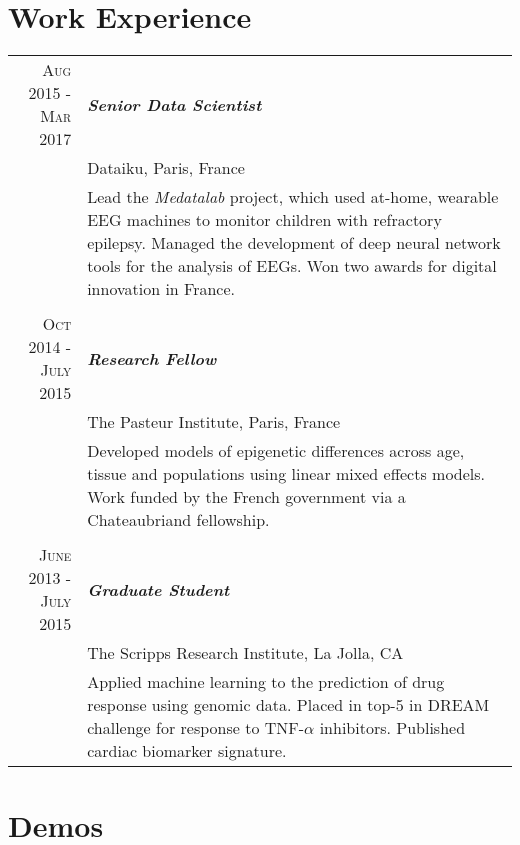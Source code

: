\documentclass{article}
\begin{document}
\section{Work Experience}
\begin{tabular}{r | p{11cm}}

 \raggedleft \textsc{Aug} 2015 - \textsc{Mar} 2017 & \emph{\textbf{Senior Data Scientist}} \\
   & Dataiku, Paris, France\\
 &\footnotesize{Lead the \emph{Medatalab} project, which used at-home, wearable EEG machines to monitor children with refractory epilepsy. Managed the development of deep neural network tools for the analysis of EEGs. Won two awards for digital innovation in France.} \\
 
 \multicolumn{2}{c}{} \\
 
\raggedleft \textsc{Oct} 2014 - \textsc{July} 2015 & \emph{\textbf{Research Fellow}} \\
   & The Pasteur Institute, Paris, France\\
 &\footnotesize{Developed models of epigenetic differences across age, tissue and populations using linear mixed effects models. Work funded by the French government via a Chateaubriand fellowship.} \\
 
  \multicolumn{2}{c}{} \\
 
\raggedleft \textsc{June} 2013 - \textsc{July} 2015 & \emph{\textbf{Graduate Student}} \\
   & The Scripps Research Institute, La Jolla, CA\\
 &\footnotesize{Applied machine learning to the prediction of drug response using genomic data. Placed in top-5 in DREAM challenge for response to TNF-$\alpha$ inhibitors. Published cardiac biomarker signature.} \\

\end{tabular}


\section{Demos}
\end{document}
